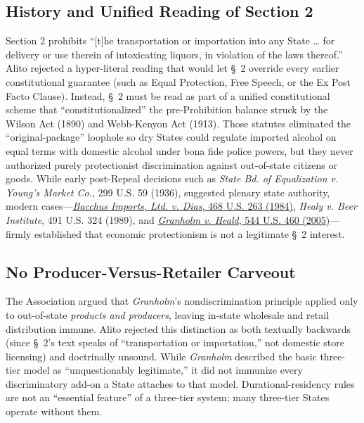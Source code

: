 \documentclass[12pt]{article}
\begin{document}
\subsection{History and Unified Reading of Section 2}
Section 2 prohibits ``[t]he transportation or importation into any State \ldots{} for delivery or use therein of intoxicating liquors, in violation of the laws thereof.'' Alito rejected a hyper-literal reading that would let \S~2 override every earlier constitutional guarantee (such as Equal Protection, Free Speech, or the Ex Post Facto Clause). Instead, \S~2 must be read as part of a unified constitutional scheme that ``constitutionalized'' the pre-Prohibition balance struck by the Wilson Act (1890) and Webb-Kenyon Act (1913). Those statutes eliminated the ``original-package'' loophole so dry States could regulate imported alcohol on equal terms with domestic alcohol under bona fide police powers, but they never authorized purely protectionist discrimination against out-of-state citizens or goods. While early post-Repeal decisions such as \textit{State Bd. of Equalization v. Young's Market Co.}, 299 U.S. 59 (1936), suggested plenary state authority, modern cases---\href{https://supreme.justia.com/cases/federal/us/468/263/}{\textit{Bacchus Imports, Ltd. v. Dias}, 468 U.S. 263 (1984)}, \textit{Healy v. Beer Institute}, 491 U.S. 324 (1989), and \href{https://supreme.justia.com/cases/federal/us/544/460/}{\textit{Granholm v. Heald}, 544 U.S. 460 (2005)}---firmly established that economic protectionism is not a legitimate \S~2 interest.

\subsection{No Producer-Versus-Retailer Carveout}
The Association argued that \textit{Granholm}'s nondiscrimination principle applied only to out-of-state \textit{products and producers}, leaving in-state wholesale and retail distribution immune. Alito rejected this distinction as both textually backwards (since \S~2's text speaks of ``transportation or importation,'' not domestic store licensing) and doctrinally unsound. While \textit{Granholm} described the basic three-tier model as ``unquestionably legitimate,'' it did not immunize every discriminatory add-on a State attaches to that model. Durational-residency rules are not an ``essential feature'' of a three-tier system; many three-tier States operate without them.
\end{document}
